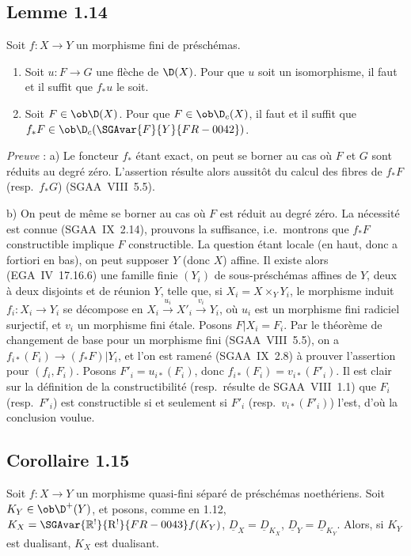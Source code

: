 \subsection*{Lemme 1.14}
Soit $f : X \to Y$ un morphisme fini de préschémas.
\begin{enumerate}
\item[a)] Soit $u : F \to G$ une flèche de $\D(X)$. Pour que $u$ soit un isomorphisme, il faut et il suffit que $f_{*}u$ le soit.
\item[b)]
Soit $F \in \ob \D(X)$. Pour que $F \in \ob \D_c(X)$, il faut et il suffit que $f_{*}F \in \ob \D_c(\SGAvar{F}{Y}{FR-0042})$.
\end{enumerate}

\emph{Preuve} : a) Le foncteur $f_{*}$ étant exact, on peut se borner au cas où $F$ et $G$ sont réduits au degré zéro. L'assertion résulte alors aussitôt du calcul des fibres de $f_{*}F$ (resp.~$f_{*}G$) (SGAA~VIII~5.5).

b) On peut de même se borner au cas où $F$ est réduit au degré zéro. La nécessité est connue (SGAA~IX~2.14), prouvons la suffisance, i.e.~montrons que $f_{*}F$ constructible implique $F$ constructible. La question étant locale (en haut, donc a fortiori en bas), on peut supposer $Y$ (donc $X$) affine. Il existe alors (EGA~IV~17.16.6) une famille finie $(Y_i)$ de sous-préschémas affines de $Y$, deux à deux disjoints et de réunion $Y$, telle que, si $X_i = X \times_Y Y_i$, le morphisme induit $f_i : X_i \to Y_i$ se décompose en $X_i \xrightarrow{u_i} X'_i \xrightarrow{v_i} Y_i$, où $u_i$ est un morphisme fini radiciel surjectif, et $v_i$ un morphisme fini étale. Posons $F|X_i = F_i$. Par le théorème de changement de base pour un morphisme fini (SGAA~VIII~5.5), on a $f_{i*}(F_i) \to (f_{*}F)|Y_i$, et l'on est ramené (SGAA~IX~2.8) à prouver l'assertion pour $(f_i, F_i)$. Posons $F'_i = u_{i*}(F_i)$, donc $f_{i*}(F_i) = v_{i*}(F'_i)$. Il est clair sur la définition de la constructibilité (resp.~résulte de SGAA~VIII~1.1) que $F_i$ (resp.~$F'_i$) est constructible si et seulement si $F'_i$ (resp.~$v_{i*}(F'_i)$) l'est, d'où la conclusion voulue.

\subsection*{Corollaire 1.15}
Soit $f : X \to Y$ un morphisme quasi-fini séparé de préschémas noethériens. Soit $K_Y \in \ob \D^{+}(Y)$, et posons, comme en 1.12, $K_X = \SGAvar{\mathbb{R}^{!}}{\mathrm{R}^{!}}{FR-0043}f(K_Y)$, $\underline{D}_X = \underline{D}_{K_X}$, $\underline{D}_Y = \underline{D}_{K_Y}$. Alors, si $K_Y$ est dualisant, $K_X$ est dualisant.

